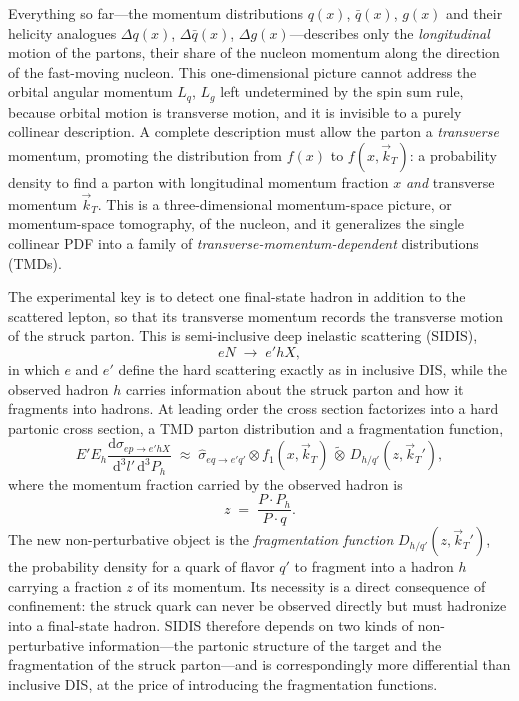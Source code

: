 Everything so far---the momentum distributions $q(x)$, $\bar q(x)$, $g(x)$ and their
helicity analogues $\Delta q(x)$, $\Delta\bar q(x)$, $\Delta g(x)$---describes only the
\emph{longitudinal} motion of the partons, their share of the nucleon momentum along the
direction of the fast-moving nucleon. This one-dimensional picture cannot address the
orbital angular momentum $L_{q}$, $L_{g}$ left undetermined by the spin sum rule, because
orbital motion is transverse motion, and it is invisible to a purely collinear
description. A complete description must allow the parton a \emph{transverse} momentum,
promoting the distribution from $f(x)$ to $f(x,\vec k_{T})$: a probability density to
find a parton with longitudinal momentum fraction $x$ \emph{and} transverse momentum
$\vec k_{T}$. This is a three-dimensional momentum-space picture, or momentum-space
tomography, of the nucleon, and it generalizes the single collinear PDF into a family of
\emph{transverse-momentum-dependent} distributions (TMDs).

The experimental key is to detect one final-state hadron in addition to the scattered
lepton, so that its transverse momentum records the transverse motion of the struck
parton. This is semi-inclusive deep inelastic scattering (SIDIS),
\begin{equation}
    eN \;\rightarrow\; e' h X,
\end{equation}
in which $e$ and $e'$ define the hard scattering exactly as in inclusive DIS, while the
observed hadron $h$ carries information about the struck parton and how it fragments into
hadrons. At leading order the cross section factorizes into a hard partonic cross section,
a TMD parton distribution and a fragmentation function,
\begin{equation}
    E'E_{h}\frac{\mathrm{d}\sigma_{ep\to e'hX}}{\mathrm{d}^{3}l'\,\mathrm{d}^{3}P_{h}}
    \;\approx\; \hat\sigma_{eq\to e'q'}\otimes f_{1}(x,\vec k_{T})
    \,\widetilde{\otimes}\, D_{h/q'}(z,\vec k_{T}'),
    \label{eq:sidis-factorization}
\end{equation}
where the momentum fraction carried by the observed hadron is
\begin{equation}
    z \;=\; \frac{P\cdot P_{h}}{P\cdot q}.
    \label{eq:z-def}
\end{equation}
The new non-perturbative object is the \emph{fragmentation function}
$D_{h/q'}(z,\vec k_{T}')$, the probability density for a quark of flavor $q'$ to fragment
into a hadron $h$ carrying a fraction $z$ of its momentum. Its necessity is a direct
consequence of confinement: the struck quark can never be observed directly but must
hadronize into a final-state hadron. SIDIS therefore depends on two kinds of
non-perturbative information---the partonic structure of the target and the fragmentation
of the struck parton---and is correspondingly more differential than inclusive DIS, at the
price of introducing the fragmentation functions.

